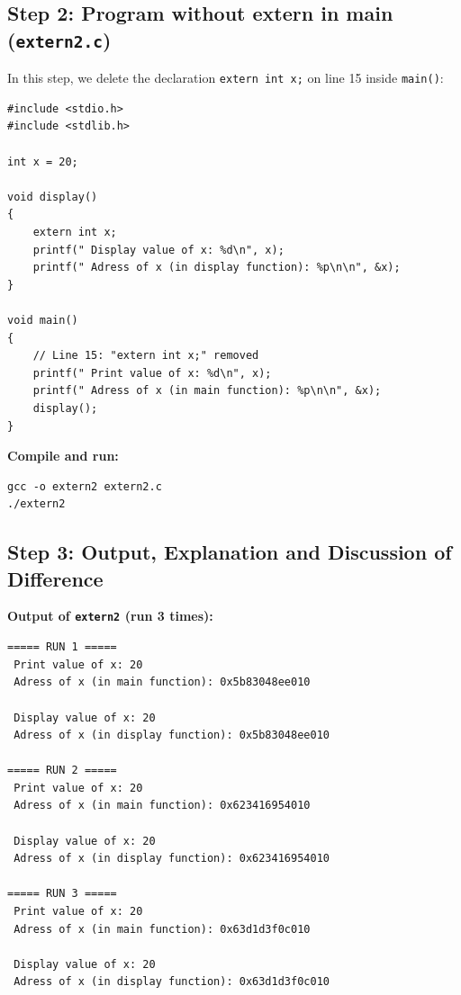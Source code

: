 \documentclass[12pt,a4paper]{article}
\begin{document}
\subsection{Step 2: Program without extern in main (\texttt{extern2.c})}

In this step, we delete the declaration \texttt{extern int x;} on line 15 inside \texttt{main()}:

\begin{lstlisting}[style=cstyle]
#include <stdio.h>
#include <stdlib.h>

int x = 20;

void display()
{
    extern int x;
    printf(" Display value of x: %d\n", x);
    printf(" Adress of x (in display function): %p\n\n", &x);
}

void main()
{
    // Line 15: "extern int x;" removed
    printf(" Print value of x: %d\n", x);
    printf(" Adress of x (in main function): %p\n\n", &x);
    display();
}
\end{lstlisting}

\textbf{Compile and run:}
\begin{lstlisting}[style=bashstyle]
gcc -o extern2 extern2.c
./extern2
\end{lstlisting}

\subsection{Step 3: Output, Explanation and Discussion of Difference}

\textbf{Output of \texttt{extern2} (run 3 times):}
\begin{lstlisting}[style=outstyle]
===== RUN 1 =====
 Print value of x: 20
 Adress of x (in main function): 0x5b83048ee010

 Display value of x: 20
 Adress of x (in display function): 0x5b83048ee010

===== RUN 2 =====
 Print value of x: 20
 Adress of x (in main function): 0x623416954010

 Display value of x: 20
 Adress of x (in display function): 0x623416954010

===== RUN 3 =====
 Print value of x: 20
 Adress of x (in main function): 0x63d1d3f0c010

 Display value of x: 20
 Adress of x (in display function): 0x63d1d3f0c010
\end{lstlisting}
\end{document}

